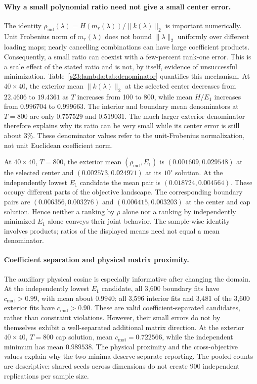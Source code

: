 \documentclass[12pt,letterpaper]{article}
\theoremstyle{plain}
\theoremstyle{definition}
\begin{document}
\paragraph{Why a small polynomial ratio need not give a small center error.}
The identity
$\rho_{\mathrm{ind}}(\lambda)=H(m_r(\lambda))/\|k(\lambda)\|_2$
is important numerically. Unit Frobenius norm of $m_r(\lambda)$
does not bound $\|\lambda\|_2$ uniformly over different loading
maps; nearly cancelling combinations can have large coefficient
products. Consequently, a small ratio can coexist with a few-percent
rank-one error. This is a scale effect of the stated ratio and is
not, by itself, evidence of unsuccessful minimization.
Table~\ref{s23:lambda:tab:denominator} quantifies this mechanism.
At $40\times40$, the exterior mean $\|k(\lambda)\|_2$ at the
selected center decreases from $22.4606$ to $19.4361$ as $T$
increases from 100 to 800, while mean $H/E_1$ increases from
$0.996704$ to $0.999663$. The interior and boundary mean
denominators at $T=800$ are only $0.757529$ and $0.519031$.
The much larger exterior denominator therefore explains why its
ratio can be very small while its center error is still about
$3\%$. These denominator values refer to the unit-Frobenius
normalization, not unit Euclidean coefficient norm.

At $40\times40$, $T=800$, the exterior mean
$(\rho_{\mathrm{ind}},E_1)$ is $(0.001609,0.029548)$ at the
selected center and $(0.002573,0.024971)$ at its $10^\circ$
solution. At the independently lowest $E_1$ candidate the mean pair
is $(0.018724,0.004564)$. These occupy different parts of the
objective landscape. The corresponding boundary pairs are
$(0.006356,0.003276)$ and $(0.006415,0.003203)$ at the center
and cap solution. Hence neither a ranking by $\rho$ alone nor a
ranking by independently minimized $E_1$ alone conveys their joint
behavior. The sample-wise identity involves products; ratios of
the displayed means need not equal a mean denominator.

\paragraph{Coefficient separation and physical matrix proximity.}
The auxiliary physical cosine is especially informative after
changing the domain. At the independently lowest $E_1$ candidate,
all 3,600 boundary fits have $c_{\mathrm{mat}}>0.99$, with mean
about $0.9940$; all 3,596 interior fits and 3,481 of the 3,600
exterior fits have $c_{\mathrm{mat}}>0.90$.
These are valid coefficient-separated candidates, rather than
constraint violations. However, their small errors do not by
themselves exhibit a well-separated additional matrix direction.
At the exterior $40\times40$, $T=800$ cap solution,
mean $c_{\mathrm{mat}}=0.722566$, while the independent minimum
has mean $0.989538$. The physical proximity and the cross-objective
values explain why the two minima deserve separate reporting.
The pooled counts are descriptive: shared seeds across dimensions
do not create 900 independent replications per sample size.
\end{document}
